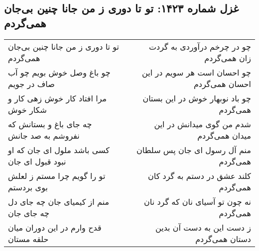 \begin{center}
\section*{غزل شماره ۱۴۲۳: تو تا دوری ز من جانا چنین بی‌جان همی‌گردم}
\label{sec:1423}
\begin{longtable}{l p{0.5cm} r}
تو تا دوری ز من جانا چنین بی‌جان همی‌گردم
&&
چو در چرخم درآوردی به گردت زان همی‌گردم
\\
چو باغ وصل خوش بویم چو آب صاف در جویم
&&
چو احسان است هر سویم در این احسان همی‌گردم
\\
مرا افتاد کار خوش زهی کار و شکار خوش
&&
چو باد نوبهار خوش در این بستان همی‌گردم
\\
چه جای باغ و بستانش که نفروشم به صد جانش
&&
شدم من گوی میدانش در این میدان همی‌گردم
\\
کسی باشد ملول ای جان که او نبود قبول ای جان
&&
منم آل رسول ای جان پس سلطان همی‌گردم
\\
تو را گویم چرا مستم ز لعلش بوی بردستم
&&
کلند عشق در دستم به گرد کان همی‌گردم
\\
منم از کیمیای جان چه جای دل چه جای جان
&&
نه چون تو آسیای نان که گرد نان همی‌گردم
\\
قدح وارم در این دوران میان حلقه مستان
&&
ز دست این به دست آن بدین دستان همی‌گردم
\\
\end{longtable}
\end{center}
